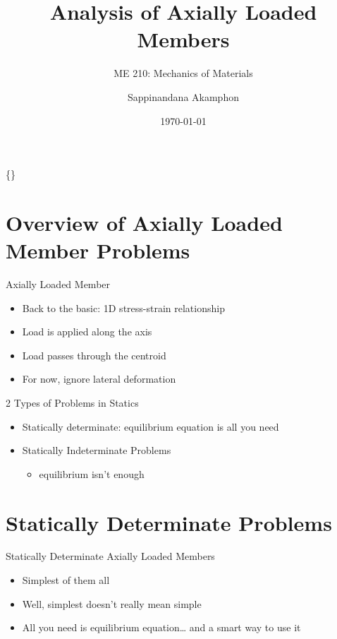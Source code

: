 \documentclass[10pt, svgnames]{beamer}
\author{Sappinandana Akamphon}
\date{\today}
\title{Analysis of Axially Loaded Members}
\subtitle{ME 210: Mechanics of Materials}
\institute{Department of Mechanical Engineering, TSE}
\date{}
\begin{document}
\begin{frame}[label={sec:org4ad1011}]{\{\}}
\maketitle
\end{frame}

\section{Overview of Axially Loaded Member Problems}
\label{overview-of-axially-loaded-member-problems}
\begin{frame}[label={sec:org9403e2e}]{Axially Loaded Member}
\begin{itemize}
\item Back to the basic: 1D stress-strain relationship

\item Load is applied along the axis

\item Load passes through the centroid

\item For now, ignore lateral deformation
\end{itemize}
\end{frame}

\begin{frame}[label={sec:orgfde4a5f}]{2 Types of Problems in Statics}
\begin{itemize}
\item Statically determinate: equilibrium equation is all you need

\item Statically Indeterminate Problems

\begin{itemize}
\item equilibrium isn't enough
\end{itemize}
\end{itemize}
\end{frame}

\section{Statically Determinate Problems}
\label{statically-determinate-problems}
\begin{frame}[label={sec:org0486a0e}]{Statically Determinate Axially Loaded Members}
\begin{itemize}
\item Simplest of them all

\item Well, simplest doesn't really mean simple

\item All you need is equilibrium equation\ldots{} and a smart way to use it
\end{itemize}
\end{frame}
\end{document}
